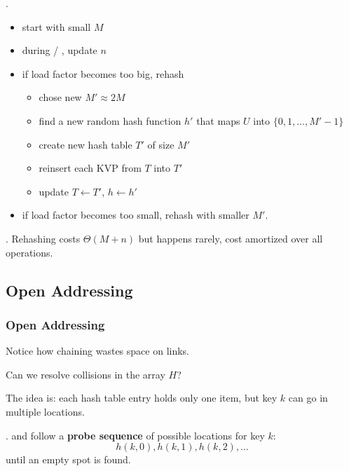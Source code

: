 \documentclass{article}
\begin{document}
\begin{algo}[].
    \begin{itemize}
        \item start with small $M$
        \item during / , update $n$ 
        \item if load factor becomes too big, rehash \begin{itemize}
            \item chose new $M' \approx 2M$
            \item find a new random hash function $h'$ that maps $U$ into $\{0, 1, \ldots, M' -1\}$ 
            \item create new hash table $T'$ of size $M'$ 
            \item reinsert each KVP from $T$ into $T'$ 
            \item update $T \leftarrow T'$, $h \leftarrow h'$ 
        \end{itemize} 
        \item if load factor becomes too small, rehash with smaller $M'$. 
    \end{itemize}
\end{algo}

\begin{result}[].
    Rehashing costs $\Theta(M + n)$ but happens rarely, cost amortized over all operations. 
\end{result}

\subsection{Open Addressing} 

\subsubsection{Open Addressing}

Notice how chaining wastes space on links. 

\begin{Question}{}
    Can we resolve collisions in the array $H$?  
\end{Question}

\begin{solution}
    The idea is: each hash table entry holds only one item, but key $k$ can go in multiple locations. 
\end{solution}

\begin{deff}.
     and  follow a \textbf{probe sequence} of possible locations for key $k$: 
    \[ h(k,0), h(k,1), h(k,2), \ldots \] 
    until an empty spot is found. 
\end{deff}
\end{document}

